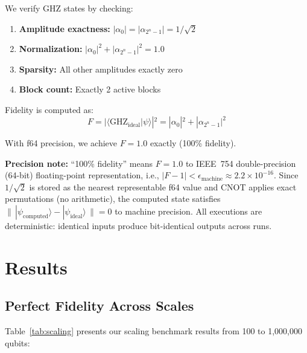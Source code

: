\documentclass[11pt,twocolumn]{article}
\begin{document}
We verify GHZ states by checking:
\begin{enumerate}
    \item \textbf{Amplitude exactness:} $|\alpha_0| = |\alpha_{2^n-1}| = 1/\sqrt{2}$
    \item \textbf{Normalization:} $|\alpha_0|^2 + |\alpha_{2^n-1}|^2 = 1.0$
    \item \textbf{Sparsity:} All other amplitudes exactly zero
    \item \textbf{Block count:} Exactly 2 active blocks
\end{enumerate}

Fidelity is computed as:
\begin{equation}
    F = |\langle\text{GHZ}_\text{ideal}|\psi\rangle|^2 = |\alpha_0|^2 + |\alpha_{2^n-1}|^2
\end{equation}

With f64 precision, we achieve $F = 1.0$ exactly (100\% fidelity).

\textbf{Precision note:} ``100\% fidelity'' means $F = 1.0$ to IEEE~754 double-precision (64-bit) floating-point representation, i.e., $|F - 1| < \epsilon_{\text{machine}} \approx 2.2 \times 10^{-16}$. Since $1/\sqrt{2}$ is stored as the nearest representable f64 value and CNOT applies exact permutations (no arithmetic), the computed state satisfies $\|\,|\psi_{\text{computed}}\rangle - |\psi_{\text{ideal}}\rangle\,\| = 0$ to machine precision. All executions are deterministic: identical inputs produce bit-identical outputs across runs.

\section{Results}

\subsection{Perfect Fidelity Across Scales}

Table~\ref{tab:scaling} presents our scaling benchmark results from 100 to 1,000,000 qubits:
\end{document}
